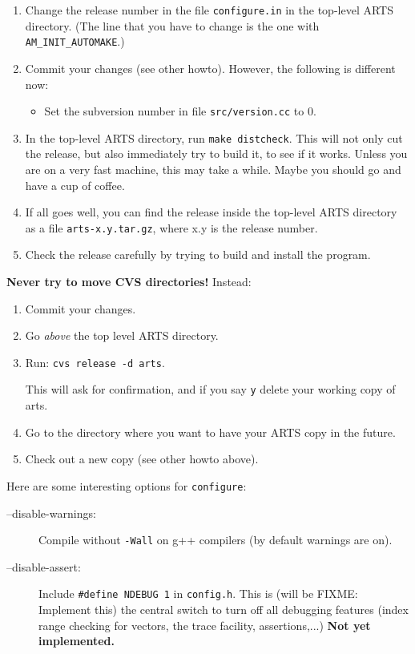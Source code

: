 \label{sec:release}
\begin{enumerate}
\item Change the release number in the file \verb|configure.in| in the
  top-level ARTS directory. (The line that you have to change is the
  one with \verb|AM_INIT_AUTOMAKE|.)
\item Commit your changes (see other howto). However, the
  following is different now:
  \begin{itemize}
  \item Set the subversion number in file \verb|src/version.cc| to 0.
  \end{itemize}
\item In the top-level ARTS directory, run \verb|make distcheck|. This
  will not only cut the release, but also immediately try to build
  it, to see if it works. Unless you are on a very fast machine, this
  may take a while. Maybe you should go and have a cup of coffee.
\item If all goes well, you can find the release inside the top-level
  ARTS directory as a file \verb|arts-x.y.tar.gz|, where x.y is the
  release number.
\item Check the release carefully by trying to build and install the
  program. 
\end{enumerate}


\textbf{Never try to move CVS directories!} Instead:
\begin{enumerate}
\item Commit your changes.
\item Go \emph{above} the top level ARTS directory.
\item Run: \verb|cvs release -d arts|.
  
  This will ask for confirmation, and if you say \verb|y| delete your
  working copy of arts.
\item Go to the directory where you want to have your ARTS copy in the
  future.
\item Check out a new copy (see other howto above).
\end{enumerate}




Here are some interesting options for \verb|configure|:

\begin{description}
\item[--disable-warnings:] 
  Compile without \verb|-Wall| on g++ compilers (by default warnings are on).
\item[--disable-assert:]
   Include \verb|#define NDEBUG 1| in \verb|config.h|.
   This is (will be FIXME: Implement this) the central switch to turn
   off all debugging features (index range checking for vectors, the
   trace facility, assertions,...) \textbf{Not yet implemented.}

\end{description}


